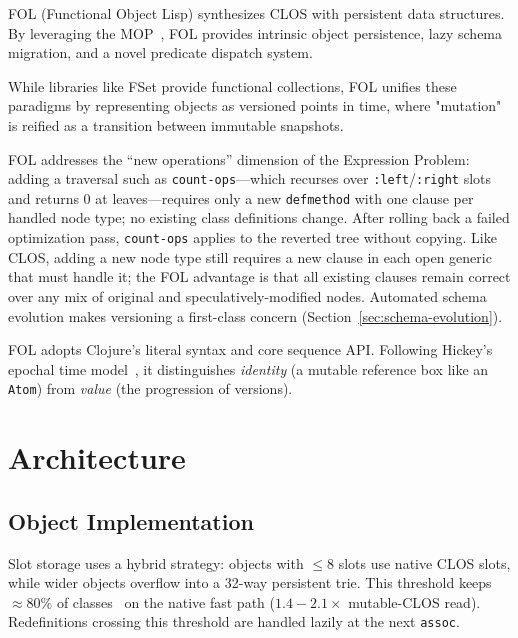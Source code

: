 \documentclass[sigconf,nonacm]{acmart}
\begin{document}
\maketitle

FOL (Functional Object Lisp) synthesizes CLOS with persistent data structures. By leveraging the MOP~\cite{Kiczales1991}, FOL provides intrinsic object persistence, lazy schema migration, and a novel predicate dispatch system.

While libraries like FSet provide functional collections, FOL unifies these paradigms by representing objects as versioned points in time, where "mutation" is reified as a transition between immutable snapshots.

FOL addresses the ``new operations'' dimension of the Expression Problem: adding a traversal such as \texttt{count-ops}---which recurses over \texttt{:left}/\texttt{:right} slots and returns 0 at leaves---requires only a new \texttt{defmethod} with one clause per handled node type; no existing class definitions change. After rolling back a failed optimization pass, \texttt{count-ops} applies to the reverted tree without copying. Like CLOS, adding a new node type still requires a new clause in each open generic that must handle it; the FOL advantage is that all existing clauses remain correct over any mix of original and speculatively-modified nodes. Automated schema evolution makes versioning a first-class concern (Section~\ref{sec:schema-evolution}).

FOL adopts Clojure's literal syntax and core sequence API. Following Hickey's epochal time model~\cite{Hickey2009}, it distinguishes \textit{identity} (a mutable reference box like an \texttt{Atom}) from \textit{value} (the progression of versions).

\section{Architecture}

\subsection{Object Implementation}
Slot storage uses a hybrid strategy: objects with $\le 8$ slots use native CLOS slots, while wider objects overflow into a 32-way persistent trie. This threshold keeps $\approx$80\% of classes~\cite{Lanza2006} on the native fast path ($1.4-2.1\times$ mutable-CLOS read). Redefinitions crossing this threshold are handled lazily at the next \texttt{assoc}.
\end{document}
